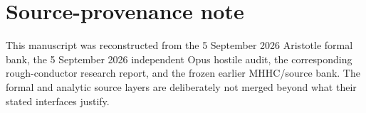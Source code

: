 \section*{Source-provenance note}

This manuscript was reconstructed from the 5 September 2026 Aristotle formal
bank, the 5 September 2026 independent Opus hostile audit, the corresponding
rough-conductor research report, and the frozen earlier MHHC/source bank.  The
formal and analytic source layers are deliberately not merged beyond what their
stated interfaces justify.

\printbibliography



